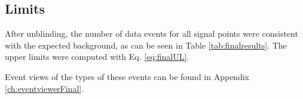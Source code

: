 \subsection{Limits}
\label{subsec:limits}
After unblinding, the number of data events for all signal points were consistent with the expected background, as can be seen in Table \ref{tab:finalresults}. The upper limits were computed with Eq. \ref{eq:finalUL}.

Event views of the types of these events can be found in Appendix \ref{ch:eventviewerFinal}.


\begin{table}[]
\centering
\renewcommand{\arraystretch}{1.5}
\caption{Final results of the upper limit computations. For the signal, we show the expected rate from a $10^{-14} \ \textrm{cm}^{-2} \textrm{s}^{-1} \textrm{sr}^{-1}$ flux and both background and signal are normalized to the total livetime of the full dataset.}
\label{tab:finalresults}
\end{table}
